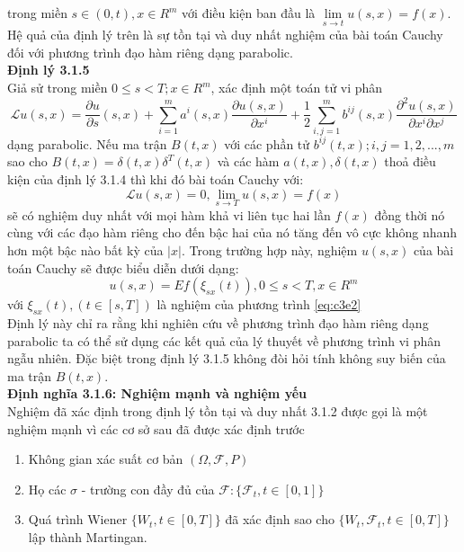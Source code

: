 \documentclass[12pt,a4paper]{article}
\begin{document}
trong miền $s\in(0,t),x\in R^m$ với điều kiện ban đầu là $\lim\limits_{s\rightarrow t}u(s,x)=f(x)$.\\
Hệ quả của định lý trên là sự tồn tại và duy nhất nghiệm của bài toán Cauchy đối với phương trình đạo hàm riêng dạng parabolic.\\
\textbf{Định lý 3.1.5}\\
Giả sử trong miền $0\leq s<T;x\in R^m$, xác định một toán tử vi phân
\begin{equation*}
	\mathscr{L}u(s,x)=\dfrac{\partial u}{\partial s}(s,x)+\sum_{i=1}^{m}a^i(s,x)\dfrac{\partial u(s,x)}{\partial x^i}+\dfrac{1}{2}\sum_{i,j=1}^{m}b^{ij}(s,x)\dfrac{\partial^2u(s,x)}{\partial x^i\partial x^j}
\end{equation*}
dạng parabolic. Nếu ma trận $B(t,x)$ với các phần tử $b^{ij}(t,x);i,j=1,2,...,m$ sao cho $B(t,x)=\delta(t,x)\delta^T(t,x)$ và các hàm $a(t,x),\delta(t,x)$ thoả điều kiện của định lý 3.1.4 thì khi đó bài toán Cauchy với:
\begin{equation*}
	\mathscr{L}u(s,x)=0,\lim\limits_{s\rightarrow T}u(s,x)=f(x)
\end{equation*} 
sẽ có nghiệm duy nhất với mọi hàm khả vi liên tục hai lần $f(x)$ đồng thời nó cùng với các đạo hàm riêng cho đến bậc hai của nó tăng đến vô cực không nhanh hơn một bậc nào bất kỳ của $|x|$. Trong trường hợp này, nghiệm $u(s,x)$ của bài toán Cauchy sẽ được biểu diễn dưới dạng:
\begin{equation*}
	u(s,x)=Ef(\xi_{sx}(t)),0\leq s<T,x\in R^m
\end{equation*}
với $\xi_{sx}(t),(t\in[s,T])$ là nghiệm của phương trình \eqref{eq:c3e2}\\
Định lý này chỉ ra rằng khi nghiên cứu về phương trình đạo hàm riêng dạng parabolic ta có thể sử dụng các kết quả của lý thuyết về phương trình vi phân ngẫu nhiên. Đặc biệt trong định lý 3.1.5 không đòi hỏi tính không suy biến của ma trận $B(t,x)$.\\
\textbf{Định nghĩa 3.1.6: Nghiệm mạnh và nghiệm yếu}\\
Nghiệm đã xác định trong định lý tồn tại và duy nhất 3.1.2 được gọi là một nghiệm mạnh vì các cơ sở sau đã được xác định trước
\begin{enumerate}[1)]
	\item Không gian xác suất cơ bản $(\Omega,\mathscr{F},P)$
	\item Họ các $\sigma$ - trường con đầy đủ của $\mathscr{F}:\{\mathscr{F}_t,t\in[0,1]\}$
	\item Quá trình Wiener $\{W_t,t\in[0,T]\}$ đã xác định sao cho $\{W_t,\mathscr{F}_t,t\in[0,T]\}$ lập thành Martingan.
\end{enumerate}
\end{document}
